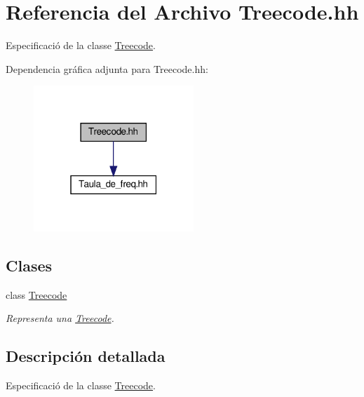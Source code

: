 \hypertarget{_treecode_8hh}{}\section{Referencia del Archivo Treecode.\+hh}
\label{_treecode_8hh}


Especificació de la classe \hyperlink{class_treecode}{Treecode}.  


Dependencia gráfica adjunta para Treecode.\+hh\+:\nopagebreak
\begin{figure}[H]
\begin{center}
\leavevmode
\includegraphics[width=171pt]{_treecode_8hh__incl}
\end{center}
\end{figure}
\subsection*{Clases}
\begin{DoxyCompactItemize}
\item 
class \hyperlink{class_treecode}{Treecode}
\begin{DoxyCompactList}\small\item\em Representa una \hyperlink{class_treecode}{Treecode}. \end{DoxyCompactList}\end{DoxyCompactItemize}


\subsection{Descripción detallada}
Especificació de la classe \hyperlink{class_treecode}{Treecode}. 


